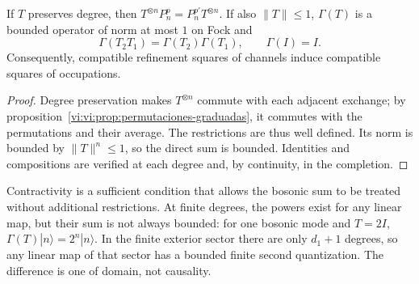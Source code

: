 \begin{theorem}
\label{vi:vi:thm:fock-naturalidad}
If \(T\) preserves degree, then
\(T^{\otimes n}P_n^p=P_n^{p'}T^{\otimes n}\).
If also \(\|T\|\le1\), \(\Gamma(T)\) is a bounded
operator of norm at most \(1\) on Fock and
\[
 \Gamma(T_2T_1)=\Gamma(T_2)\Gamma(T_1),\qquad
 \Gamma(I)=I.
\]
Consequently, compatible refinement squares
of channels induce compatible squares of occupations.
\end{theorem}
\begin{proof}
Degree preservation makes \(T^{\otimes n}\) commute
with each adjacent exchange; by
proposition~\ref{vi:vi:prop:permutaciones-graduadas}, it commutes
with the permutations and their average. The restrictions
are thus well defined. Its norm is bounded by
\(\|T\|^n\le1\), so the direct sum is bounded.
Identities and compositions are verified at each degree
and, by continuity, in the completion.
\end{proof}

Contractivity is a sufficient condition that allows the bosonic
sum to be treated without additional restrictions. At finite degrees,
the powers exist for any linear map, but their
sum is not always bounded: for one bosonic mode and \(T=2I\),
\(\Gamma(T)|n\rangle=2^n|n\rangle\). In the finite exterior
sector there are only \(d_1+1\) degrees, so any
linear map of that sector has a bounded finite second
quantization. The difference is one of domain, not causality.

